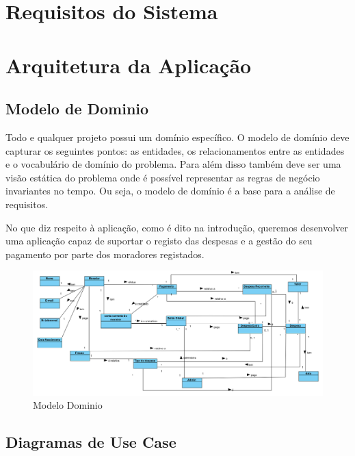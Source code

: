 \chapter{Requisitos do Sistema}

\chapter{Arquitetura da Aplicação}


\section{Modelo de Dominio }
Todo e qualquer projeto possui um domínio específico. O modelo de domínio deve capturar os seguintes pontos: as entidades, os relacionamentos entre as entidades e o vocabulário de domínio do problema. Para além disso também deve ser uma visão estática do problema onde é possível representar as regras de negócio invariantes no tempo. Ou seja, o modelo de domínio é a base para a análise de requisitos.

No que diz respeito à aplicação, como é dito na introdução, queremos desenvolver uma aplicação capaz de suportar o registo das despesas e a gestão do seu pagamento por parte dos moradores registados.


\begin{figure}[htb!]
	\includegraphics[scale=0.566]{modelodominio}  
	\caption{Modelo Dominio}  
\end{figure}


\section{Diagramas de Use Case}


